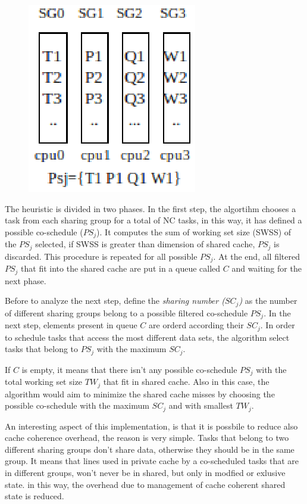 \begin{description}
\begin{figure}[htbp]
\centering
\includegraphics[width=\widefigure]{images/possible_cosched.eps}
\caption{}
\label{fig:possible_cosched}
\end{figure}

The heuristic is divided in two phases. In the first step, the algortihm chooses a task from each sharing group for a total of NC tasks, in this way, it
has defined a possible co-schedule ($PS_j$). It computes the sum of working set size (SWSS) of the $PS_j$ selected, if SWSS is greater than dimension of 
shared cache, $PS_j$ is discarded. This procedure is repeated for all possible $PS_j$. At the end, all filtered $PS_j$ that fit into the shared cache are 
put in a queue called $C$ and waiting for the next phase.

Before to analyze the next step, define the \textit{sharing number ($SC_j$)} as the number of different sharing groups belong to a possible filtered 
co-schedule $PS_j$. In the next step, elements present in queue $C$ are orderd according their $SC_j$. In order to schedule tasks that access the most 
different data sets, the algorithm select tasks that belong to $PS_j$ with the maximum $SC_j$.

If $C$ is empty, it means that there isn't any possible co-schedule $PS_j$ with the total working set size $TW_j$ that fit in shared cache. Also in this 
case, the algorithm would aim to minimize the shared cache misses by choosing the possible co-schedule with the maximum $SC_j$ and with smallest $TW_j$.

An interesting aspect of this implementation, is that it is possbile to reduce also cache coherence overhead, the reason is very simple. Tasks that belong 
to two different sharing groups don't share data, otherwise they should be in the same group. It means that lines used in private cache by
a co-scheduled tasks that are in different groups, won't never be in shared, but only in modfied or exlusive state. in this way, the overhead due to 
management of cache coherent shared state is reduced. 


\end{description}
